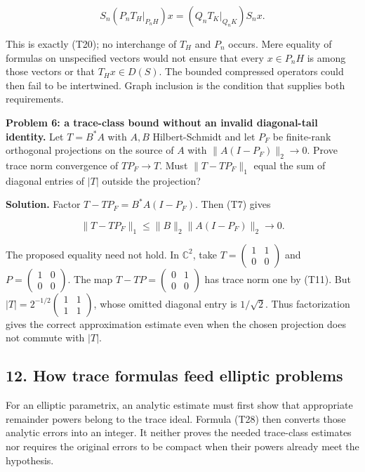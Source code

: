 \documentclass[
  11pt,
]{article}
\begin{document}
\[
S_n(P_nT_H|_{P_nH})x
=(Q_nT_K|_{Q_nK})S_nx.
\]

This is exactly (T20); no interchange of \(T_H\) and \(P_n\) occurs.
Mere equality of formulas on unspecified vectors would not ensure that
every \(x\in P_nH\) is among those vectors or that \(T_Hx\in D(S)\). The
bounded compressed operators could then fail to be intertwined. Graph
inclusion is the condition that supplies both requirements.

\textbf{Problem 6: a trace-class bound without an invalid diagonal-tail
identity.} Let \(T=B^*A\) with \(A,B\) Hilbert-Schmidt and let \(P_F\)
be finite-rank orthogonal projections on the source of \(A\) with
\(\|A(I-P_F)\|_2\to0\). Prove trace norm convergence of \(TP_F\to T\).
Must \(\|T-TP_F\|_1\) equal the sum of diagonal entries of \(|T|\)
outside the projection?

\textbf{Solution.} Factor \(T-TP_F=B^*A(I-P_F)\). Then (T7) gives

\[
\|T-TP_F\|_1\leq\|B\|_2\|A(I-P_F)\|_2\longrightarrow0.
\]

The proposed equality need not hold. In \(\mathbb C^2\), take
\(T=\begin{pmatrix}1&1\\0&0\end{pmatrix}\) and
\(P=\begin{pmatrix}1&0\\0&0\end{pmatrix}\). The map
\(T-TP=\begin{pmatrix}0&1\\0&0\end{pmatrix}\) has trace norm one by
(T11). But \(|T|=2^{-1/2}\begin{pmatrix}1&1\\1&1\end{pmatrix}\), whose
omitted diagonal entry is \(1/\sqrt2\). Thus factorization gives the
correct approximation estimate even when the chosen projection does not
commute with \(|T|\).

\subsection{12. How trace formulas feed elliptic
problems}\label{how-trace-formulas-feed-elliptic-problems}

For an elliptic parametrix, an analytic estimate must first show that
appropriate remainder powers belong to the trace ideal. Formula (T28)
then converts those analytic errors into an integer. It neither proves
the needed trace-class estimates nor requires the original errors to be
compact when their powers already meet the hypothesis.
\end{document}
